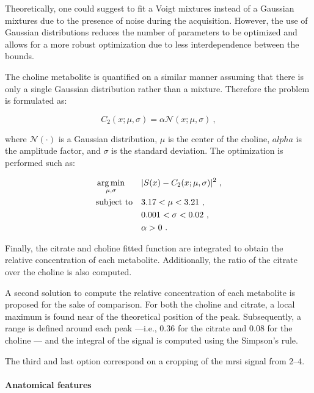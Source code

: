 Theoretically, one could suggest to fit a Voigt mixtures instead of a Gaussian mixtures due to the presence of noise during the acquisition.
However, the use of Gaussian distributions reduces the number of parameters to be optimized and allows for a more robust optimization due to less interdependence between the bounds.

The choline metabolite is quantified on a similar manner assuming that there is only a single Gaussian distribution rather than a mixture.
Therefore the problem is formulated as:

\begin{equation}
  C_2(x; \mu, \sigma) = \alpha \mathcal{N}(x; \mu, \sigma) \ ,
  \label{eq:costcho}
\end{equation}

\noindent where $\mathcal{N}(\cdot)$ is a Gaussian distribution, $\mu$ is the center of the choline, $alpha$ is the amplitude factor, and $\sigma$ is the standard deviation. The optimization is performed such as:

\begin{equation}
\begin{aligned}
& \operatorname*{arg\,min}_{\mathbf{\mu, \sigma}} 
& & | S(x) - C_2(x; \mu, \sigma) |^{2} \ , \label{eq:mincostcho} \\
& \text{subject to}
& & 3.17 < \mu < 3.21 \ , \\
&&& 0.001 < \sigma < 0.02 \ , \\
&&& \alpha > 0 \ .
\end{aligned}
\end{equation}

Finally, the citrate and choline fitted function are integrated to obtain the relative concentration of each metabolite.
Additionally, the ratio of the citrate over the choline is also computed.

A second solution to compute the relative concentration of each metabolite is proposed for the sake of comparison.
For both the choline and citrate, a local maximum is found near of the theoretical position of the peak.
Subsequently, a range is defined around each peak ---i.e., \SI{0.36}{\ppm} for the citrate and \SI{0.08}{\ppm} for the choline --- and the integral of the signal is computed using the Simpson's rule.

The third and last option correspond on a cropping of the \ac{mrsi} signal from \SIrange{2}{4}{\ppm}.

\paragraph{Anatomical features}

